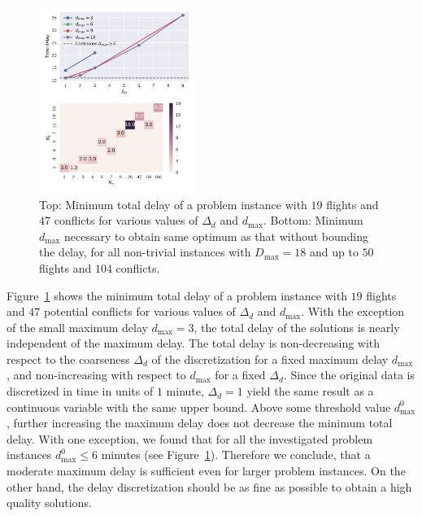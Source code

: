 \begin{figure}[h]
\centering
\includegraphics[width=0.45\textwidth]{./pics/delay_only_cp_results.pdf}
\caption[Effect of discretization on solution quality]{Top: Minimum total delay of a problem instance with $19$ flights and $47$ conflicts for various values of $\Delta_d$ and $d_{\max}$.
    Bottom: Minimum $d_\text{max}$ necessary to obtain same optimum as that without bounding the delay, for all non-trivial instances with $D_\text{max}=18$ and up to $50$ flights and $104$ conflicts.}
\label{fig:delay_only_cp_results}
\end{figure}

Figure~\ref{fig:delay_only_cp_results} shows the minimum total delay of a problem instance with $19$ flights and $47$ potential conflicts for various values of $\Delta_d$ and $d_{\max}$.
With the exception of the small maximum delay $d_\text{max} = 3$, the total delay of the solutions is nearly independent of the maximum delay.
The total delay is non-decreasing with respect to the coarseness $\Delta_d$ of the discretization for a fixed maximum delay $d_{\max}$, and non-increasing with respect to $d_{\max}$ for a fixed $\Delta_d$.
Since the original data is discretized in time in units of $1$ minute, $\Delta_d=1$ yield the same result as a continuous variable with the same upper bound.
Above some threshold value $d^0_\text{max}$, further increasing the maximum delay does not decrease the minimum total delay.
With one exception, we found that for all the investigated problem instances $d^0_\text{max}\leq6$ minutes (see Figure~\ref{fig:delay_only_cp_results}).
Therefore we conclude, that a moderate maximum delay is sufficient even for larger problem instances.
On the other hand, the delay discretization should be as fine as possible to obtain a high quality solutions.



